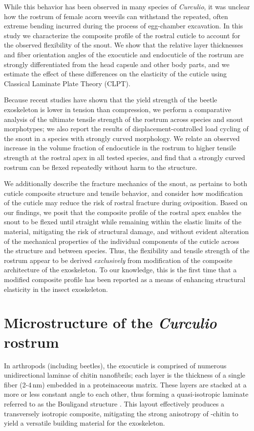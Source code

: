 \documentclass[twocolumn, linenumbers, superscriptaddress]{revtex4-1}
\begin{document}
{	While this behavior has been observed in many species of \textit{Curculio}, it was unclear how the rostrum of female acorn weevils can withstand the repeated, often extreme bending incurred during the process of egg-chamber excavation.
	In this study we characterize the composite profile of the rostral cuticle to account for the observed flexibility of the snout.
	We show that the relative layer thicknesses and fiber orientation angles of the exocuticle and endocuticle of the rostrum are strongly differentiated from the head capsule and other body parts, and we estimate the effect of these differences on the elasticity of the cuticle using Classical Laminate Plate Theory (CLPT).
	
	Because recent studies have shown that the yield strength of the beetle exoskeleton is lower in tension than compression, we perform a comparative analysis of the ultimate tensile strength of the rostrum across species and snout morphotypes; we also report the results of displacement-controlled load cycling of the snout in a species with strongly curved morphology.
	We relate an observed increase in the volume fraction of endocuticle in the rostrum to higher tensile strength at the rostral apex in all tested species, and find that a strongly curved rostrum can be flexed repeatedly without harm to the structure.
	
	We additionally describe the fracture mechanics of the snout, as pertains to both cuticle composite structure and tensile behavior, and consider how modification of the cuticle may reduce the risk of rostral fracture during oviposition.
	Based on our findings, we posit that the composite profile of the rostral apex enables the snout to be flexed until straight while remaining within the elastic limits of the material, mitigating the risk of structural damage, and without evident alteration of the mechanical properties of the individual components of the cuticle across the structure and between species.
	Thus, the flexibility and tensile strength of the rostrum appear to be derived \emph{exclusively} from modification of the composite architecture of the exoskeleton.
	To our knowledge, this is the first time that a modified composite profile has been reported as a means of enhancing structural elasticity in the insect exoskeleton.
}	
	\section{Microstructure of the \textit{Curculio} rostrum}
		In arthropods (including beetles), the exocuticle is comprised of numerous unidirectional laminae of chitin nanofibrils; each layer is the thickness of a single fiber (2-4\,nm) embedded in a proteinaceous matrix.
		These layers are stacked at a more or less constant angle to each other, thus forming a quasi-isotropic laminate referred to as the Bouligand structure \cite{Blackwell1980,Bouligand1972,Neville1976}. 
		This layout effectively produces a transversely isotropic composite, mitigating the strong anisotropy of \textalpha-chitin to yield a versatile building material for the exoskeleton.
		
\end{document}
